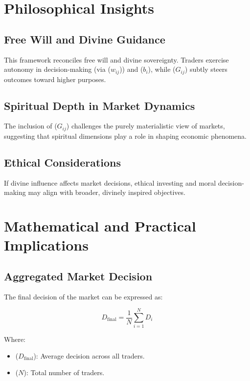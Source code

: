 \documentclass[a4]{article}
\newcommand{\bn}{\bigskip\noindent}
\begin{document}
\bn
\section{Philosophical Insights}

\subsection{Free Will and Divine Guidance}

This framework reconciles free will and divine sovereignty. Traders exercise autonomy in decision-making (via ($w_{ij}$)) and ($b_i$), while ($G_{ij}$) subtly steers outcomes toward higher purposes.

\subsection{Spiritual Depth in Market Dynamics}

The inclusion of ($G_{ij}$) challenges the purely materialistic view of markets, suggesting that spiritual dimensions play a role in shaping economic phenomena.

\subsection{Ethical Considerations}

If divine influence affects market decisions, ethical investing and moral decision-making may align with broader, divinely inspired objectives.


\section{Mathematical and Practical Implications}

\subsection{Aggregated Market Decision}

The final decision of the market can be expressed as:

$$
D_{\text{final}} = \frac{1}{N} \sum_{i=1}^{N} D_i
$$

Where:

\begin{itemize}
\item  ($D_{\text{final}}$): Average decision across all traders.
\item ($N$): Total number of traders.
\end{itemize}
\end{document}

